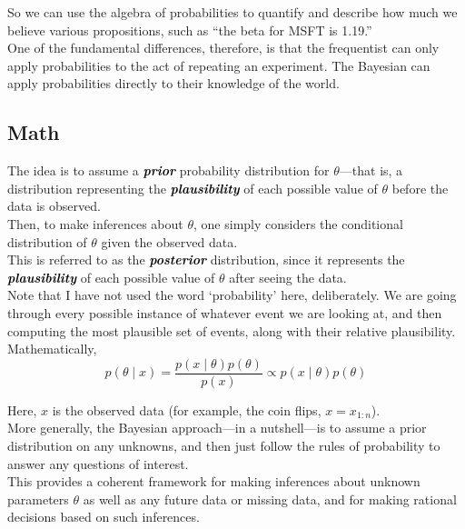 \documentclass[14pt]{extarticle}
\newcommand{\mynotes}[2][Gray]{\textcolor{#1}{\textbf{\textit{#2}}}}
\begin{document}
So we can use the algebra of probabilities to quantify and describe how much we believe various propositions, such as “the beta for MSFT is 1.19.” \\

One of the fundamental differences, therefore, is that the frequentist can only apply probabilities to the act of repeating an experiment. The Bayesian can apply probabilities directly to their knowledge of the world. 

\subsection{Math}
The idea is to assume a \mynotes[black]{prior} probability distribution for $\theta$—that is, a distribution representing the \mynotes[black]{plausibility} of each possible value of $\theta$ before the data is observed. \\

Then, to make inferences about $\theta$, one simply considers the conditional distribution of $\theta$ given the observed data. \\

This is referred to as the \mynotes[black]{posterior} distribution, since it represents the \mynotes[black]{plausibility} of each possible value of $\theta$ after seeing the data. \\

Note that I have not used the word `probability' here, deliberately. We are going through every possible instance of whatever event we are looking at, and then computing the most plausible set of events, along with their relative plausibility. \\

Mathematically,
\begin{equation*}
	p(\theta \mid x) = \frac{p(x \mid \theta) p(\theta)}{p(x)} \propto p(x \mid \theta) p(\theta)
\end{equation*}

Here, $x$ is the observed data (for example, the coin flips, $x = x_{1:n}$).  \\

More generally, the Bayesian approach—in a nutshell—is to assume a prior distribution on any unknowns, and then just follow the rules of probability to answer any questions of interest. \\

This provides a coherent framework for making inferences about unknown parameters $\theta$ as well as any future data or missing data, and for making rational decisions based on such inferences.
\end{document}
